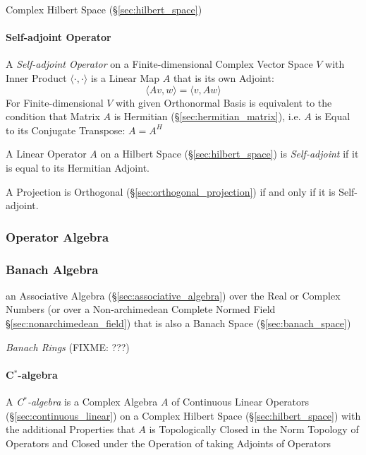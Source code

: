 Complex Hilbert Space (\S\ref{sec:hilbert_space})



\paragraph{Self-adjoint Operator}\label{sec:self_adjoint_operator}\hfill

A \emph{Self-adjoint Operator} on a Finite-dimensional Complex Vector Space $V$
with Inner Product $\langle{\cdot, \cdot}\rangle$ is a Linear Map $A$ that is
its own Adjoint:
\[
  \langle{Av,w}\rangle = \langle{v,Aw}\rangle
\]
For Finite-dimensional $V$ with given Orthonormal Basis is equivalent to the
condition that Matrix $A$ is Hermitian (\S\ref{sec:hermitian_matrix}), i.e. $A$
is Equal to its Conjugate Transpose: $A = A^H$

A Linear Operator $A$ on a Hilbert Space (\S\ref{sec:hilbert_space}) is
\emph{Self-adjoint} if it is equal to its Hermitian Adjoint.

A Projection is Orthogonal (\S\ref{sec:orthogonal_projection}) if and only if
it is Self-adjoint.



\subsubsection{Operator Algebra}\label{sec:operator_algebra}

\subsubsection{Banach Algebra}\label{sec:banach_algebra}

an Associative Algebra (\S\ref{sec:associative_algebra}) over the Real or
Complex Numbers (or over a Non-archimedean Complete Normed Field
\S\ref{sec:nonarchimedean_field}) that is also a Banach Space
(\S\ref{sec:banach_space})

\emph{Banach Rings} (FIXME: ???)



\paragraph{C$^*$-algebra}\label{sec:cstar_algebra}\hfill

A \emph{C$^*$-algebra} is a Complex Algebra $A$ of Continuous Linear
Operators (\S\ref{sec:continuous_linear}) on a Complex Hilbert Space
(\S\ref{sec:hilbert_space}) with the additional Properties that $A$ is
Topologically Closed in the Norm Topology of Operators and Closed
under the Operation of taking Adjoints of Operators

